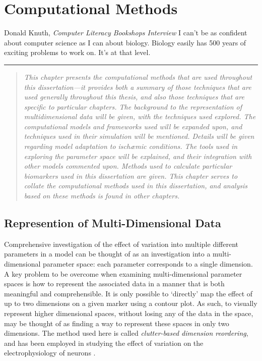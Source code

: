 \documentclass[../thesis-main.tex]{subfiles}
\begin{document}
\chapter{Computational Methods}
\label{ch:compMethods}

\begin{aquote}{Donald Knuth, \emph{Computer Literacy Bookshops Interview}}
  {\selectfont
   I can't be as confident about computer science as I can about biology. Biology easily has 500 years of exciting problems to work on. It's at that level.
  }
\end{aquote}
\rule{\linewidth}{0.25mm}

\begin{quote}
 \emph{This chapter presents the computational methods that are used throughout this dissertation---it provides both a summary of those techniques that are used generally throughout this thesis, and also those techniques that are specific to particular chapters. The background to the representation of multidimensional data will be given, with the techniques used explored. The computational models and frameworks used will be expanded upon, and techniques used in their simulation  will be mentioned. Details will be given regarding model adaptation to isch\ae{}mic conditions. The tools used in exploring the parameter space will be explained, and their integration with other models commented upon. Methods used to calculate particular biomarkers used in this dissertation are given. This chapter serves to collate the computational methods used in this dissertation, and analysis based on these methods is found in other chapters.}
\end{quote}

\section{Represention of Multi-Dimensional Data}
\label{subsec:cbdr}
Comprehensive investigation of the effect of variation into multiple different parameters in a model can be thought of as an investigation into a multi-dimensional parameter space: each parameter corresponds to a single dimension. A key problem to be overcome when examining multi-dimensional parameter spaces is how to represent the associated data in a manner that is both meaningful and comprehensible. It is only possible to `directly' map the effect of up to two dimensions on a given marker using a contour plot. As such, to visually represent higher dimensional spaces, without losing any of the data in the space, may be thought of as finding a way to represent these spaces in only two dimensions. The method used here is called \emph{clutter-based dimension reordering}, and has been employed in studying the effect of variation on the electrophysiology of neurons \citep{LeBlanc1990, Peng2004, Peng2005, Taylor2006}.
\end{document}
